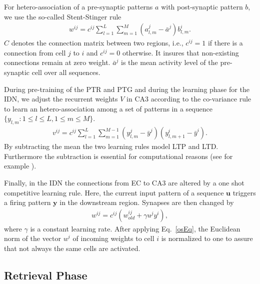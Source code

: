 \documentclass[utf8]{frontiersSCNS} %
\begin{document}
For hetero-association of a pre-synaptic patterns $a$ with post-synaptic pattern $b$, we use the so-called Stent-Stinger rule \cite{stent1973physiological}
%
\begin{align}
	\label{heteroEq}
	w^{ij} = c^{ij}\sum_{l=1}^L{\sum_{m=1}^M(a^j_{l, m}  - \bar {a}^j)b_{l, m}^i}.
\end{align}
$C$ denotes the connection matrix between two regions, i.e., $c^{ij} = 1$ if there is a connection from cell $j$ to $i$ and $c^{ij} = 0$ otherwise. It insures that non-existing connections remain at zero weight. $\bar{a}^j$ is the mean activity level of the pre-synaptic cell over all sequences. 

During pre-training of the PTR and PTG and during the learning phase for the IDN, we adjust the recurrent weights $V$ in CA3 according to the co-variance rule \cite{sejnowski1977storing} to learn an hetero-association among a set of patterns in a sequence $\{ y_{l, m}: 1\le l \le L, 1\le m \le M\}$.
\begin{align}
	\label{heteroca3Eq}
	v^{ij} =  c^{ij}\sum_{l=1}^L{\sum_{m=1}^{M-1}(y^j_{l, m}  - \bar {y}^j)(y_{l, m+1}^i - \bar{y}^i)}.
\end{align}
By subtracting the mean the two learning rules model LTP and LTD. Furthermore the subtraction is essential for computational reasons (see for example \cite[chapter 8.2]{amit1992modeling}).

Finally, in the IDN the connections from EC to CA3 are altered by a one shot competitive learning rule. Here, the current input pattern of a sequence $\mathbf u$ triggers a firing pattern $\mathbf y$ in the downstream region. Synapses are then changed by
\begin{align}
	\label{osEq}
	w^{ij} = c^{ij}(w^{ij}_{old} + \gamma u^jy^i),
\end{align}
where $\gamma$ is a constant learning rate. After applying Eq.~\ref{osEq}, the Euclidean norm of the vector $w^i$ of incoming weights to cell $i$ is normalized to one to assure that not always the same cells are activated. 



\subsection{Retrieval Phase}
\label{S:4}
\end{document}
